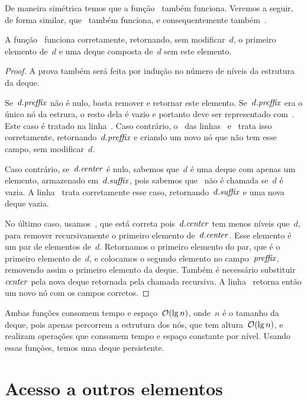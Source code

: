 \documentclass[../../main.tex]{subfiles}
\begin{document}
De maneira simétrica temos que a função~ também funciona. Veremos a seguir, de forma similar, que~ também funciona, e consequentemente também~.

\begin{proposition}
A função~ funciona corretamente, retornando, sem modificar~$d$, o primeiro elemento de~$d$ e uma deque composta de~$d$ sem este elemento.
\end{proposition}

\begin{proof}
A prova também será feita por indução no número de níveis da estrutura da deque.

    Se~$d.\mathit{preffix}$ não é nulo, basta remover e retornar este elemento. Se~$d.\mathit{preffix}$ era o único nó da estrura, o resto dela é vazio e portanto deve ser representado com~. Este caso é tratado na linha~. Caso contrário, o~ das linhas~ e~ trata isso corretamente, retornando~$d.\mathit{preffix}$ e criando um novo nó que não tem esse campo, sem modificar~$d$.

Caso contrário, se~$d.\mathit{center}$ é nulo, sabemos que~$d$ é uma deque com apenas um elemento, armazenado em~$d.\mathit{suffix}$, pois sabemos que~ não é chamada se~$d$ é vazia. A linha~ trata corretamente esse caso, retornando~$d.\mathit{suffix}$ e uma nova deque vazia.

No último caso, usamos~, que está correta pois~$d.\mathit{center}$ tem menos níveis que~$d$, para remover recursivamente o primeiro elemento de~$d.\mathit{center}$. Esse elemento é um par de elementos de~$d$. Retornamos o primeiro elemento do par, que é o primeiro elemento de~$d$, e colocamos o segundo elemento no campo~$\mathit{preffix}$, removendo assim o primeiro elemento da deque. Também é necessário substituir~$\mathit{center}$ pela nova deque retornada pela chamada recursiva. A linha~ retorna então um novo nó com os campos corretos.
\end{proof}

Ambas funções consomem tempo e espaço~$\mathcal{O}(\lg n)$, onde~$n$ é o tamanho da deque, pois apenas percorrem a estrutura dos nós, que tem altura~$\mathcal{O}(\lg n)$, e realizam operações que consomem tempo e espaço constante por nível. Usando essas funções, temos uma deque persistente.

\section{Acesso a outros elementos}
\end{document}
